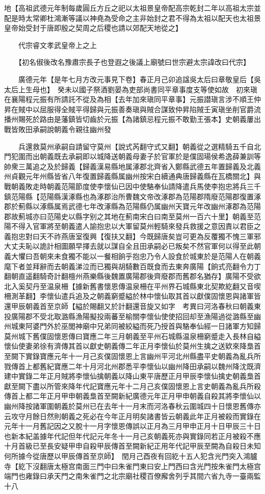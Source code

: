 地【高祖武德元年制每歲圓丘方丘之祀以太祖景皇帝配高宗乾封二年以高祖太宗並配是時太常卿杜鴻漸等議以神堯為受命之主非始封之君不得為太祖以配天也太祖景皇帝始受封于唐即殷之契周之后稷也請以郊配天地從之】

　　代宗睿文孝武皇帝上之上

　　【初名俶後改名豫肅宗長子也登遐之後議上廟號曰世宗避太宗諱改曰代宗】

　　廣德元年【是年七月方改元事見下卷】春正月己卯追諡吳太后曰章敬皇后【吳太后上生母也】　癸未以國子祭酒劉晏為吏部尚書同平章事度支等使如故　初來瑱在襄陽程元振有所請託不從及為相【去年加來瑱同平章事】元振譛瑱言涉不順王仲昇在賊中以屈服得全賊平得歸與元振善奏瑱與賊合謀致仲昇陷賊壬寅瑱坐削官爵流播州賜死於路由是藩鎮皆切齒於元振【為諸鎮忌程元振不敢勤王張本】史朝義屢出戰皆敗田承嗣說朝義令親往幽州發

　　兵還救莫州承嗣自請留守莫州【說式芮翻守式又翻】朝義從之選精騎五千自北門犯圍而出朝義既去承嗣即以城降送朝義母妻子於官軍於是僕固瑒侯希逸薛兼訓等帥衆三萬追之及於歸義【歸義漢易縣地属涿郡北齊省入鄭縣武德五年置歸義及北義州貞觀元年州縣皆省八年復置歸義縣属幽州按宋白續通典唐歸義縣在瓦橋關北】與戰朝義敗走時朝義范陽節度使李懷仙已因中使駱奉仙請降遣兵馬使李抱忠將兵三千鎮范陽縣【范陽縣漢涿縣也為涿郡治所曹魏文帝改涿郡為范陽郡隋廢范陽郡復置涿郡於薊縣以涿縣属焉武德七年改涿縣為范陽縣仍属幽州天寶元年改幽州涿郡為范陽郡故薊城亦曰范陽史以縣字别之其地在薊南宋白曰南至莫州一百六十里】朝義至范陽不得入官軍將至朝義遣人諭抱忠以大軍留莫州輕騎來發兵救援之意因責以君臣之義抱忠對曰天不祚燕唐室復興【復扶又翻】今既歸唐矣豈可更為反覆獨不愧三軍邪大丈夫恥以詭計相圖願早擇去就以謀自全且田承嗣必已叛矣不然官軍何以得至此朝義大懼曰吾朝來未食獨不能以一餐相餉乎抱忠乃令人設食於城東於是范陽人在朝義麾下者並拜辭而去朝義涕泣而已獨與胡騎數百既食而去東奔廣陽【餉式亮翻令力丁翻朝直遥翻騎奇計翻檀州燕樂縣後魏置廣陽郡後齊廢郡而舊郡名猶存】廣陽不受欲北入奚契丹至温泉柵【據新舊書懷恩傳温泉柵在平州界石城縣東北契欺紇翻又音喫柵測革翻】李懷仙遣兵追及之朝義窮蹙縊於林中懷仙取其首以獻僕固懷恩與諸軍皆還甲辰朝義首至京師【縊於賜翻又於計翻還音旋又如字　考異曰河洛春秋曰朝義東投廣陽郡不受北取潞縣漁陽擬投兩蕃至榆關李懷仙使使招回却至漁陽過從潞縣至幽州城東阿婆門外於巫閭神廟中兄弟同被絞縊而死乃授首與駱奉仙經一日諸軍方知歸莫州城下舊僕固懷恩傳曰寶應二年三月朝義至平州石城縣温泉柵窮蹙走入長林自縊懷仙使妻弟徐有濟傳其首以獻史朝義傳二年正月李懷仙於莫州生擒之送欵來降梟首至闕下實錄寶應元年十一月己亥僕固懷恩上言幽州平河北州縣盡平史朝義為亂兵所戮傳首上都舊紀寶應二年十月河北州郡悉平李懷仙以幽州降田承嗣以魏州降沈既濟建中實錄二年正月賊將李懷仙擒朝義以降山東平唐歷正月甲辰李懷仙擒史朝義梟首獻至闕下盡以所管來降年代記寶應元年十二月己亥僕固懷恩上言史朝義為亂兵所殺傳首上都二年正月甲申朝義梟首至闕新紀廣德元年正月甲申朝義自殺其將李懷仙以幽州降按諸軍圍朝義於莫州已在去年十一月末而河洛春秋云圍城四十日懷恩舊傳亦云攻守月餘日然則朝義之死必在今年正月明矣諸書皆云朝義此年正月被殺而實錄在元年十一月舊記因之又脫十一月字懷恩傳誤以正月為三月甲申正月十日甲辰三十日也新本紀盖據年代記但年代記元年冬十一月己亥朝義死亦與實錄同若正月被殺不應十月首級已至長安疑甲申自殺甲辰傳首至闕新紀正用年代記甲辰至闕為自殺日未知何所據今從唐歷以甲辰傳首至京師】　閏月己酉夜有回紇十五人犯含光門突入鴻臚寺【紇下沒翻唐太極宫南面三門中曰朱雀門東曰安上門西曰含光門按朱雀門太極宫端門也雍錄曰承天門之南朱雀門之北宗廟社稷百僚廨舍列乎其間六省九寺一臺兩監十八